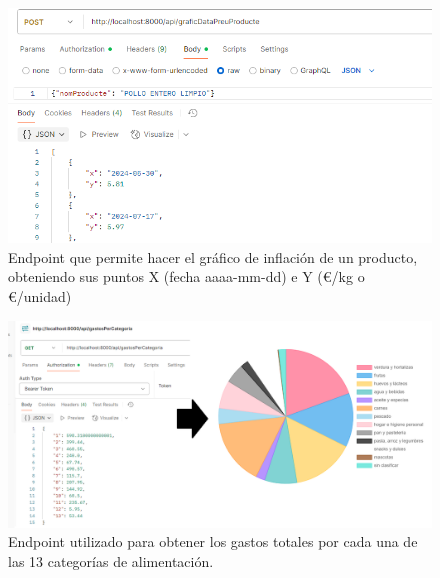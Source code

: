 \documentclass{beamer}
\begin{document}
		
		\begin{frame}
			\begin{figure}
				\centering
				\includegraphics[width=1\linewidth]{imgEspecifiques/endpointGraficDataPreuProducte}
				\caption{Endpoint que permite hacer el gráfico de inflación de un producto, obteniendo sus puntos X (fecha aaaa-mm-dd) e Y (€/kg o €/unidad)}
				\label{fig:endpointgraficdatapreuproducte}
			\end{figure}
			
		\end{frame}
		
		
		
		\begin{frame}
			\begin{figure}
				\centering
				\includegraphics[width=1\linewidth]{imgEspecifiques/dashboardD}
				\caption{Endpoint utilizado para obtener los gastos totales por cada una de las 13 categorías de alimentación.}
				\label{fig:dashboardD}
			\end{figure}
			
		\end{frame}
		
		
		
		
		
\end{document}
